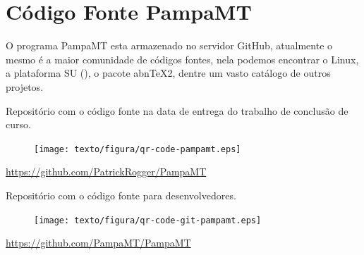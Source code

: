 \chapter{Código Fonte {PampaMT}}

    \vspace*{1cm} 
    
    O programa PampaMT esta armazenado no servidor GitHub, atualmente o mesmo é a maior comunidade de códigos fontes, nela podemos encontrar o  Linux, a plataforma SU (), o pacote abn\TeX2, dentre um vasto catálogo de outros projetos.   
    
    \vspace*{1cm}
    
    \begin{center}
    Repositório com o código fonte na data de entrega do trabalho de conclusão de curso.
    \end{center}
    
    \begin{figure}[h]
        \begin{center}
            \texttt{[image: texto/figura/qr-code-pampamt.eps]}
        \end{center}
    \end{figure}
    \begin{center}
        \url{https://github.com/PatrickRogger/PampaMT}
    \end{center}
    
    \begin{center}
    Repositório com o código fonte para desenvolvedores.
    \end{center}
    
    \begin{figure}[h]
        \begin{center}
            \texttt{[image: texto/figura/qr-code-git-pampamt.eps]}
        \end{center}
    \end{figure}
    \begin{center}
        \url{https://github.com/PampaMT/PampaMT}
    \end{center}

    \vfill
